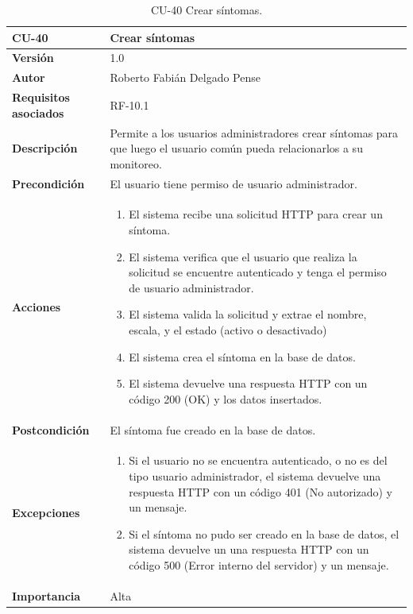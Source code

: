\begin{table}[p]
	\centering
	\begin{tabularx}{\linewidth}{ p{} p{} }
		\toprule
		\textbf{CU-40}    & \textbf{Crear síntomas}\\
		\toprule
		\textbf{Versión}              & 1.0    \\
		\textbf{Autor}                & Roberto Fabián Delgado Pense \\
		\textbf{Requisitos asociados} & RF-10.1 \\ 
		\textbf{Descripción}          & Permite a los usuarios administradores crear síntomas para que luego el usuario común pueda relacionarlos a su monitoreo. \\
		\textbf{Precondición}         & El usuario tiene permiso de usuario administrador. \\  
		\textbf{Acciones}             &
		\begin{enumerate}
			\def\labelenumi{\arabic{enumi}.}
			\tightlist
			\item El sistema recibe una solicitud HTTP para crear un síntoma.
                \item El sistema verifica que el usuario que realiza la solicitud se encuentre autenticado y tenga el permiso de usuario administrador.
                \item El sistema valida la solicitud y extrae el nombre, escala, y el estado (activo o desactivado)
                \item El sistema crea el síntoma en la base de datos.
                \item El sistema devuelve una respuesta HTTP con un código 200 (OK) y los datos insertados.         
            \end{enumerate}\\
		\textbf{Postcondición}        & El síntoma fue creado en la base de datos. \\
		\textbf{Excepciones}          & 
              \begin{enumerate}
			\def\labelenumi{\arabic{enumi}.}
			\tightlist
   			\item Si el usuario no se encuentra autenticado, o no es del tipo usuario administrador, el sistema devuelve una                 respuesta HTTP con un código 401 (No autorizado) y un mensaje.
                \item   Si el síntoma no pudo ser creado en la base de datos, el sistema devuelve un                           una respuesta HTTP con un código 500 (Error interno del servidor) y un mensaje. 
            \end{enumerate}\\
		\textbf{Importancia}          & Alta \\
		\bottomrule
	\end{tabularx}
	\caption{CU-40 Crear síntomas.}
\end{table}

